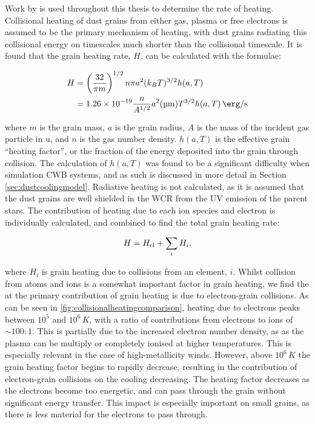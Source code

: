 Work by \textcite{dwek_infrared_1981} is used throughout this thesis to determine the rate of heating.
Collisional heating of dust grains from either gas, plasma or free electrons is assumed to be the primary mechanism of heating, with dust grains radiating this collisional energy on timescales much shorter than the collisional timescale.
It is found that the grain heating rate, $H$, can be calculated with the formulae:

\begin{equation}
  \label{eq:grainheatingrate}
  \begin{split}
    H & = \left(\frac{32}{\pi m}\right)^{1/2} n\pi a^2 (k_B T)^{3/2} h(a,T) \\
    & = \num{1.26e-19} \frac{n}{A^{1/2}} a^2 (\si{\micro\metre}) T^{3/2} h(a,T) \, \si{\erg\per\second}
  \end{split}
\end{equation}

\noindent
where $m$ is the grain mass, $a$ is the grain radius, $A$ is the mass of the incident gas particle in \si{\atomicmassunit}, and $n$ is the gas number density.
$h(a,T)$ is the effective grain ``heating factor'', or the fraction of the energy deposited into the grain through collision.
The calculation of $h(a,T)$ was found to be a significant difficulty when simulation CWB systems, and as such is discussed in more detail in Section \ref{sec:dustcoolingmodel}. 
Radiative heating is not calculated, as it is assumed that the dust grains are well shielded in the WCR from the UV emission of the parent stars.
The contribution of heating due to each ion species and electron is individually calculated, and combined to find the total grain heating rate:

\begin{equation}
  H = H_\text{el} + \sum_i H_i , 
\end{equation}

\noindent
where $H_i$ is grain heating due to collisions from an element, $i$.
Whilst collision from atoms and ions is a somewhat important factor in grain heating, we find the at the primary contribution of grain heating is due to electron-grain collisions.
As can be seen in \ref{fig:collisionalheatingcomparison}, heating due to electrons peaks between $10^5$ and $10^6 \, \si{K}$, with a ratio of contributions from electrons to ions of $\sim 100 : 1$.
This is partially due to the increased electron number density, as as the plasma can be multiply or completely ionised at higher temperatures.
This is especially relevant in the case of high-metallicity winds.
However, above $10^6\,\si{K}$ the grain heating factor begins to rapidly decrease, resulting in the contribution of electron-grain collisions on the cooling decreasing.
The heating factor decreases as the electrons become too energetic, and can pass through the grain without significant energy transfer.
This impact is especially important on small grains, as there is less material for the electrons to pass through.

